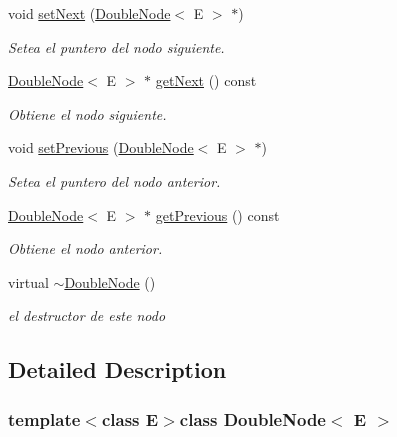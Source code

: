 \begin{DoxyCompactItemize}
\item 
void \hyperlink{class_double_node_aba52422e27040e524ba629445e9d8b93}{set\-Next} (\hyperlink{class_double_node}{Double\-Node}$<$ E $>$ $\ast$)
\begin{DoxyCompactList}\small\item\em Setea el puntero del nodo siguiente. \end{DoxyCompactList}\item 
\hyperlink{class_double_node}{Double\-Node}$<$ E $>$ $\ast$ \hyperlink{class_double_node_af5af4a30419b7a7c746361c1476e119f}{get\-Next} () const 
\begin{DoxyCompactList}\small\item\em Obtiene el nodo siguiente. \end{DoxyCompactList}\item 
void \hyperlink{class_double_node_aa76c202fdfd533984d9e9ae1892d194d}{set\-Previous} (\hyperlink{class_double_node}{Double\-Node}$<$ E $>$ $\ast$)
\begin{DoxyCompactList}\small\item\em Setea el puntero del nodo anterior. \end{DoxyCompactList}\item 
\hyperlink{class_double_node}{Double\-Node}$<$ E $>$ $\ast$ \hyperlink{class_double_node_a86c75b7ed7e944f9748363fe23b2518e}{get\-Previous} () const 
\begin{DoxyCompactList}\small\item\em Obtiene el nodo anterior. \end{DoxyCompactList}\item 
\hypertarget{class_double_node_abd78f421a570cd0fb0cecfedb979d799}{virtual \hyperlink{class_double_node_abd78f421a570cd0fb0cecfedb979d799}{$\sim$\-Double\-Node} ()}\label{class_double_node_abd78f421a570cd0fb0cecfedb979d799}

\begin{DoxyCompactList}\small\item\em el destructor de este nodo \end{DoxyCompactList}\end{DoxyCompactItemize}


\subsection{Detailed Description}
\subsubsection*{template$<$class E$>$class Double\-Node$<$ E $>$}

